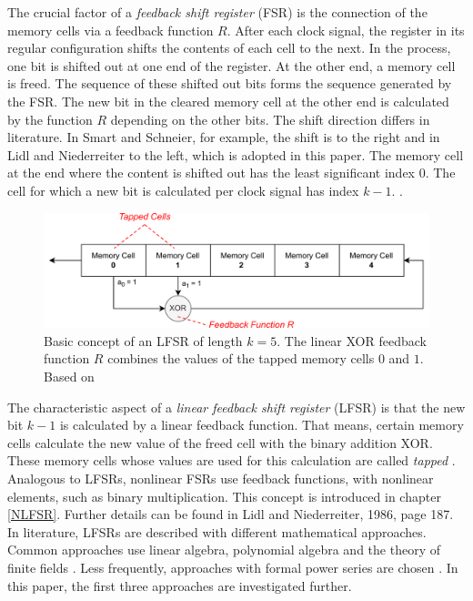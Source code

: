 The crucial factor of a \textit{feedback shift register} (FSR) is the connection of the memory cells via a feedback function $R$. After each clock signal, the register in its regular configuration shifts the contents of each cell to the next. In the process, one bit is shifted out at one end of the register. At the other end, a memory cell is freed. The sequence of these shifted out bits forms the sequence generated by the FSR. The new bit in the cleared memory cell at the other end is calculated by the function $R$ depending on the other bits. The shift direction differs in literature. In Smart and Schneier, for example, the shift is to the right \cite[p. 227]{Smart.2016}\cite[p. 429]{Schneier.2006} and in Lidl and Niederreiter to the left, which is adopted in this paper. The memory cell at the end where the content is shifted out has the least significant index $0$. The cell for which a new bit is calculated per clock signal has index $k-1$. \cite[pp. 186-187]{Lidl.1986}.
\begin{figure}[h]
	\centering
	\includegraphics[width=1\linewidth]{carl/figures/figure_3_v4_svg-raw.pdf}
	\caption{Basic concept of an LFSR of length $k=5$. The linear XOR feedback function $R$ combines the values of the tapped memory cells $0$ and $1$. Based on \cite[p. 430]{Schneier.2006}}
	\label{fig:Figure_3}
\end{figure}

The characteristic aspect of a \textit{linear feedback shift register} (LFSR) is that the new bit $k-1$ is calculated by a linear feedback function. That means, certain memory cells calculate the new value of the freed cell with the binary addition XOR. \cite[p. 82]{Stamp.2007} These memory cells whose values are used for this calculation are called \textit{tapped} \cite[p. 227]{Smart.2016}. Analogous to LFSRs, nonlinear FSRs use feedback functions, with nonlinear elements, such as binary multiplication. This concept is introduced in chapter \ref{NLFSR}. Further details can be found in Lidl and Niederreiter, 1986, page 187. \\

In literature, LFSRs are described with different mathematical approaches. Common approaches use linear algebra, polynomial algebra and the theory of finite fields \cite[pp. 186ff.]{Lidl.1986}\cite[pp. 228ff.]{Smart.2016}. Less frequently, approaches with formal power series are chosen \cite[pp. 53ff.]{Beutelspacher.2005}\cite[pp. 201ff.]{Rueppel.1986}. In this paper, the first three approaches are investigated further. \\

